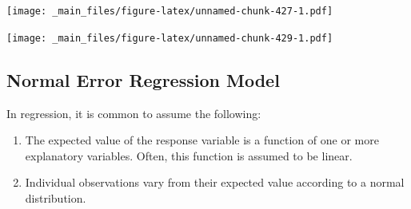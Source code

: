 \documentclass[]{book}
\newenvironment{Shaded}{\begin{snugshade}}{\end{snugshade}}
\newcommand{\KeywordTok}[1]{\textcolor[rgb]{0.13,0.29,0.53}{\textbf{#1}}}
\newcommand{\DataTypeTok}[1]{\textcolor[rgb]{0.13,0.29,0.53}{#1}}
\newcommand{\DecValTok}[1]{\textcolor[rgb]{0.00,0.00,0.81}{#1}}
\newcommand{\StringTok}[1]{\textcolor[rgb]{0.31,0.60,0.02}{#1}}
\newcommand{\OperatorTok}[1]{\textcolor[rgb]{0.81,0.36,0.00}{\textbf{#1}}}
\newcommand{\NormalTok}[1]{#1}
\begin{document}
\begin{Shaded}
\end{Shaded}

\texttt{[image: \_main\_files/figure-latex/unnamed-chunk-427-1.pdf]}

\texttt{[image: \_main\_files/figure-latex/unnamed-chunk-429-1.pdf]}

\subsection{Normal Error Regression
Model}\label{normal-error-regression-model}

In regression, it is common to assume the following:

\begin{enumerate}
\def\labelenumi{\arabic{enumi}.}
\item
  The expected value of the response variable is a function of one or
  more explanatory variables. Often, this function is assumed to be
  linear.
\item
  Individual observations vary from their expected value according to a
  normal distribution.
\end{enumerate}
\end{document}
